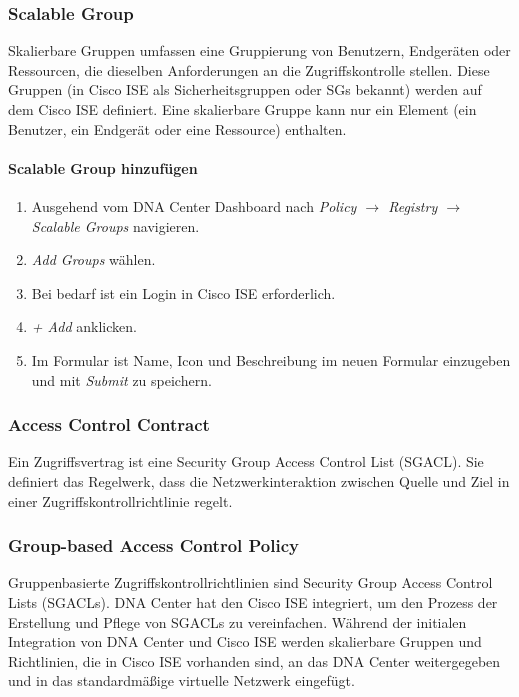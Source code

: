 \subsubsection{Scalable Group}
Skalierbare Gruppen umfassen eine Gruppierung von Benutzern, Endgeräten oder Ressourcen, die dieselben Anforderungen an die Zugriffskontrolle stellen. Diese Gruppen (in Cisco ISE als Sicherheitsgruppen oder SGs bekannt) werden auf dem Cisco ISE definiert. Eine skalierbare Gruppe kann nur ein Element (ein Benutzer, ein Endgerät oder eine Ressource) enthalten.

\paragraph{Scalable Group hinzufügen}
\begin{enumerate}
	\item Ausgehend vom DNA Center Dashboard nach \textit{Policy $\rightarrow$ Registry $\rightarrow$ Scalable Groups} navigieren. 
	\item \textit{Add Groups} wählen.
	\item Bei bedarf ist ein Login in Cisco ISE erforderlich.
	\item \textit{+ Add} anklicken.
	\item Im Formular ist Name, Icon und Beschreibung im neuen Formular einzugeben und mit \textit{Submit} zu speichern. 
\end{enumerate}

\subsubsection{Access Control Contract}
Ein Zugriffsvertrag ist eine Security Group Access Control List (SGACL). Sie definiert das Regelwerk, dass die Netzwerkinteraktion zwischen Quelle und Ziel in einer Zugriffskontrollrichtlinie regelt.

\subsubsection{Group-based Access Control Policy}
Gruppenbasierte Zugriffskontrollrichtlinien sind Security Group Access Control Lists (SGACLs). DNA Center hat den Cisco ISE integriert, um den Prozess der Erstellung und Pflege von SGACLs zu vereinfachen. Während der initialen Integration von DNA Center und Cisco ISE werden skalierbare Gruppen und Richtlinien, die in Cisco ISE vorhanden sind, an das DNA Center weitergegeben und in das standardmäßige virtuelle Netzwerk eingefügt.


